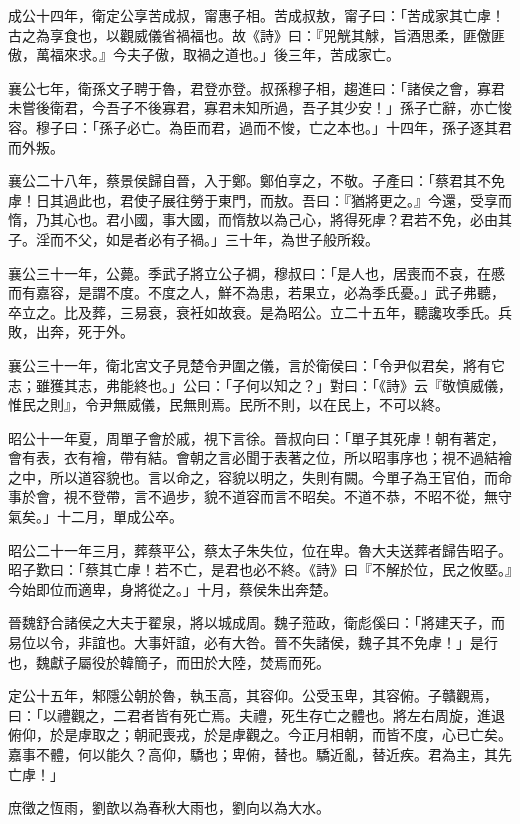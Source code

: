 \begin{pinyinscope}
成公十四年，衛定公享苦成叔，甯惠子相。苦成叔敖，甯子曰：「苦成家其亡虖！古之為享食也，以觀威儀省禍福也。故《詩》曰：『兕觥其觩，旨酒思柔，匪儌匪傲，萬福來求。』今夫子傲，取禍之道也。」後三年，苦成家亡。

襄公七年，衛孫文子聘于魯，君登亦登。叔孫穆子相，趨進曰：「諸侯之會，寡君未嘗後衛君，今吾子不後寡君，寡君未知所過，吾子其少安！」孫子亡辭，亦亡悛容。穆子曰：「孫子必亡。為臣而君，過而不悛，亡之本也。」十四年，孫子逐其君而外叛。

襄公二十八年，蔡景侯歸自晉，入于鄭。鄭伯享之，不敬。子產曰：「蔡君其不免虖！日其過此也，君使子展往勞于東門，而敖。吾曰：『猶將更之。』今還，受享而惰，乃其心也。君小國，事大國，而惰敖以為己心，將得死虖？君若不免，必由其子。淫而不父，如是者必有子禍。」三十年，為世子般所殺。

襄公三十一年，公薨。季武子將立公子裯，穆叔曰：「是人也，居喪而不哀，在慼而有嘉容，是謂不度。不度之人，鮮不為患，若果立，必為季氏憂。」武子弗聽，卒立之。比及葬，三易衰，衰衽如故衰。是為昭公。立二十五年，聽讒攻季氏。兵敗，出奔，死于外。

襄公三十一年，衛北宮文子見楚令尹圍之儀，言於衛侯曰：「令尹似君矣，將有它志；雖獲其志，弗能終也。」公曰：「子何以知之？」對曰：「《詩》云『敬慎威儀，惟民之則』，令尹無威儀，民無則焉。民所不則，以在民上，不可以終。

昭公十一年夏，周單子會於戚，視下言徐。晉叔向曰：「單子其死虖！朝有著定，會有表，衣有襘，帶有結。會朝之言必聞于表著之位，所以昭事序也；視不過結襘之中，所以道容貌也。言以命之，容貌以明之，失則有闕。今單子為王官伯，而命事於會，視不登帶，言不過步，貌不道容而言不昭矣。不道不恭，不昭不從，無守氣矣。」十二月，單成公卒。

昭公二十一年三月，葬蔡平公，蔡太子朱失位，位在卑。魯大夫送葬者歸告昭子。昭子歎曰：「蔡其亡虖！若不亡，是君也必不終。《詩》曰『不解於位，民之攸塈。』今始即位而適卑，身將從之。」十月，蔡侯朱出奔楚。

晉魏舒合諸侯之大夫于翟泉，將以城成周。魏子蒞政，衛彪傒曰：「將建天子，而易位以令，非誼也。大事奸誼，必有大咎。晉不失諸侯，魏子其不免虖！」是行也，魏獻子屬役於韓簡子，而田於大陸，焚焉而死。

定公十五年，邾隱公朝於魯，執玉高，其容仰。公受玉卑，其容俯。子贛觀焉，曰：「以禮觀之，二君者皆有死亡焉。夫禮，死生存亡之體也。將左右周旋，進退俯仰，於是虖取之；朝祀喪戎，於是虖觀之。今正月相朝，而皆不度，心已亡矣。嘉事不體，何以能久？高仰，驕也；卑俯，替也。驕近亂，替近疾。君為主，其先亡虖！」

庶徵之恆雨，劉歆以為春秋大雨也，劉向以為大水。


\end{pinyinscope}
